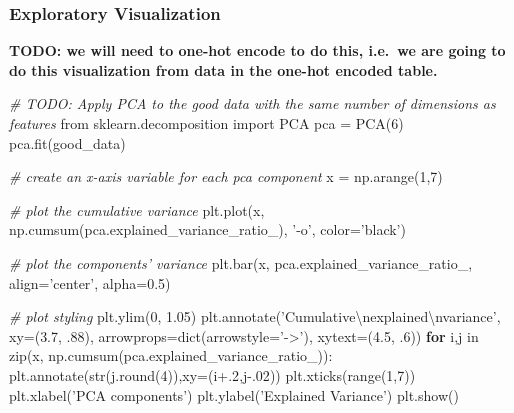\documentclass[]{report}
\newenvironment{Shaded}{}{}
\newcommand{\KeywordTok}[1]{\textcolor[rgb]{0.00,0.44,0.13}{\textbf{{#1}}}}
\newcommand{\DataTypeTok}[1]{\textcolor[rgb]{0.56,0.13,0.00}{{#1}}}
\newcommand{\DecValTok}[1]{\textcolor[rgb]{0.25,0.63,0.44}{{#1}}}
\newcommand{\FloatTok}[1]{\textcolor[rgb]{0.25,0.63,0.44}{{#1}}}
\newcommand{\CharTok}[1]{\textcolor[rgb]{0.25,0.44,0.63}{{#1}}}
\newcommand{\StringTok}[1]{\textcolor[rgb]{0.25,0.44,0.63}{{#1}}}
\newcommand{\CommentTok}[1]{\textcolor[rgb]{0.38,0.63,0.69}{\textit{{#1}}}}
\newcommand{\NormalTok}[1]{{#1}}
\begin{document}
\pagebreak

\subsubsection{Exploratory
Visualization}\label{exploratory-visualization}

\textbf{TODO: we will need to one-hot encode to do this, i.e.~we are
going to do this visualization from data in the one-hot encoded table.}

\begin{Shaded}
\begin{Highlighting}[]
\CommentTok{# TODO: Apply PCA to the good data with the same number of dimensions as features}
\CharTok{from} \NormalTok{sklearn.decomposition }\CharTok{import} \NormalTok{PCA }
\NormalTok{pca = PCA(}\DecValTok{6}\NormalTok{)}
\NormalTok{pca.fit(good_data)}
\end{Highlighting}
\end{Shaded}

\begin{Shaded}
\begin{Highlighting}[]
\CommentTok{# create an x-axis variable for each pca component}
\NormalTok{x = np.arange(}\DecValTok{1}\NormalTok{,}\DecValTok{7}\NormalTok{)}

\CommentTok{# plot the cumulative variance}
\NormalTok{plt.plot(x, np.cumsum(pca.explained_variance_ratio_), }\StringTok{'-o'}\NormalTok{, color=}\StringTok{'black'}\NormalTok{)}

\CommentTok{# plot the components' variance}
\NormalTok{plt.bar(x, pca.explained_variance_ratio_, align=}\StringTok{'center'}\NormalTok{, alpha=}\FloatTok{0.5}\NormalTok{)}

\CommentTok{# plot styling}
\NormalTok{plt.ylim(}\DecValTok{0}\NormalTok{, }\FloatTok{1.05}\NormalTok{)}
\NormalTok{plt.annotate(}\StringTok{'Cumulative}\CharTok{\textbackslash{}n}\StringTok{explained}\CharTok{\textbackslash{}n}\StringTok{variance'}\NormalTok{,}
             \NormalTok{xy=(}\FloatTok{3.7}\NormalTok{, .}\DecValTok{88}\NormalTok{), arrowprops=}\DataTypeTok{dict}\NormalTok{(arrowstyle=}\StringTok{'->'}\NormalTok{), xytext=(}\FloatTok{4.5}\NormalTok{, .}\DecValTok{6}\NormalTok{))}
\KeywordTok{for} \NormalTok{i,j in }\DataTypeTok{zip}\NormalTok{(x, np.cumsum(pca.explained_variance_ratio_)):}
    \NormalTok{plt.annotate(}\DataTypeTok{str}\NormalTok{(j.}\DataTypeTok{round}\NormalTok{(}\DecValTok{4}\NormalTok{)),xy=(i}\FloatTok{+.2}\NormalTok{,j}\FloatTok{-.02}\NormalTok{))}
\NormalTok{plt.xticks(}\DataTypeTok{range}\NormalTok{(}\DecValTok{1}\NormalTok{,}\DecValTok{7}\NormalTok{))}
\NormalTok{plt.xlabel(}\StringTok{'PCA components'}\NormalTok{)}
\NormalTok{plt.ylabel(}\StringTok{'Explained Variance'}\NormalTok{)}
\NormalTok{plt.show()}
\end{Highlighting}
\end{Shaded}
\end{document}
